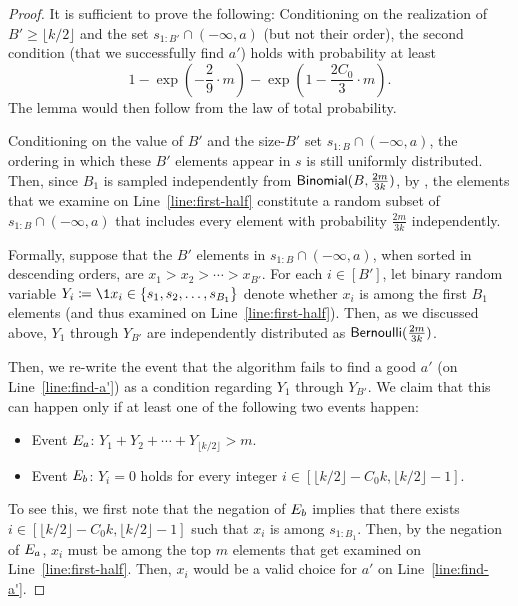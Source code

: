 \begin{proof}
    It is sufficient to prove the following: Conditioning on the realization of $B' \ge \lfloor k/2 \rfloor$ and the set $s_{1:B'} \cap (-\infty, a)$ (but not their order), the second condition (that we successfully find $a'$) holds with probability at least
    \[
        1 - \exp\left(-\frac{2}{9}\cdot m\right) - \exp\left(1-\frac{2C_0}{3}\cdot m\right).
    \]
    The lemma would then follow from the law of total probability.

    Conditioning on the value of $B'$ and the size-$B'$ set $s_{1:B} \cap (-\infty, a)$, the ordering in which these $B'$ elements appear in $s$ is still uniformly distributed. Then, since $B_1$ is sampled independently from $\mathsf{Binomial}(B, \frac{2m}{3k})$, by , the elements that we examine on Line~\ref{line:first-half} constitute a random subset of $s_{1:B} \cap (-\infty, a)$ that includes every element with probability $\frac{2m}{3k}$ independently.

    Formally, suppose that the $B'$ elements in $s_{1:B} \cap (-\infty, a)$, when sorted in descending orders, are $x_1 > x_2 > \cdots > x_{B'}$. For each $i \in [B']$, let binary random variable $Y_i \coloneqq \1{x_i \in \{s_1, s_2, \ldots, s_{B_1}\}}$ denote whether $x_i$ is among the first $B_1$ elements (and thus examined on Line~\ref{line:first-half}). Then, as we discussed above, $Y_1$ through $Y_{B'}$ are independently distributed as $\mathsf{Bernoulli}(\frac{2m}{3k})$.

    Then, we re-write the event that the algorithm fails to find a good $a'$ (on Line~\ref{line:find-a'}) as a condition regarding $Y_1$ through $Y_{B'}$. We claim that this can happen only if at least one of the following two events happen:
    \begin{itemize}
        \item Event $E_a$: $Y_1 + Y_2 + \cdots + Y_{\lfloor k/2\rfloor} > m$.
        \item Event $E_b$: $Y_i = 0$ holds for every integer $i \in [\lfloor k/2\rfloor - C_0k, \lfloor k/2\rfloor - 1]$.
    \end{itemize}
    To see this, we first note that the negation of $E_b$ implies that there exists $i \in [\lfloor k/2\rfloor - C_0k, \lfloor k/2\rfloor - 1]$ such that $x_i$ is among $s_{1:B_1}$. Then, by the negation of $E_a$, $x_i$ must be among the top $m$ elements that get examined on Line~\ref{line:first-half}. Then, $x_i$ would be a valid choice for $a'$ on Line~\ref{line:find-a'}.


\end{proof}
